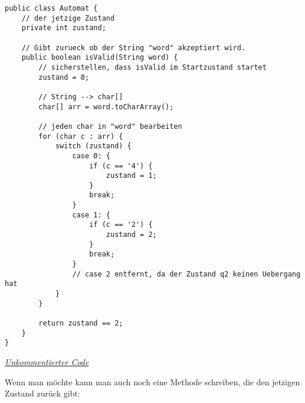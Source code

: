 \begin{center}
\begin{lstlisting}
public class Automat {
    // der jetzige Zustand
    private int zustand;

    // Gibt zurueck ob der String "word" akzeptiert wird.
    public boolean isValid(String word) {
        // sicherstellen, dass isValid im Startzustand startet
        zustand = 0;

        // String --> char[]
        char[] arr = word.toCharArray();

        // jeden char in "word" bearbeiten
        for (char c : arr) {
            switch (zustand) {
                case 0: {
                    if (c == '4') {
                        zustand = 1;
                    }
                    break;
                }
                case 1: {
                    if (c == '2') {
                        zustand = 2;
                    }
                    break;
                }
                // case 2 entfernt, da der Zustand q2 keinen Uebergang hat
            }
        }

        return zustand == 2;
    }
}
\end{lstlisting}
\href{https://raw.githubusercontent.com/tim-tm/articles/refs/heads/main/informatik-notes/code/Automat.java}{\textit{Unkommentierter Code}} \\
\end{center}

\begin{flushleft}
Wenn man möchte kann man auch noch eine Methode schreiben,
die den jetzigen Zustand zurück gibt:
\end{flushleft}

